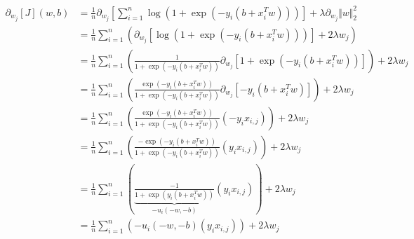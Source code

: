 \documentclass[]{article}
\begin{document}
        \begin{align*}\tag{A.6.a.2}\label{eqn:A.6.a.2}
            \partial_{w_j} \left[
                J
            \right](w, b) 
            &= \frac{1}{n} \partial_{w_j} \left[ 
                \sum_{i = 1}^{n}
                \log(1 + \exp(-y_i(b + x^T_iw))) 
            \right]
            +\lambda\partial_{w_j} \Vert w\Vert_2^2
            \\
            &= 
            \frac{1}{n} \sum_{i = 1}^{n}
            \left(
                \partial_{w_j} \left[ 
                    \log(1 + \exp(-y_i(b + x^T_iw))) 
                \right] + 2\lambda w_j
            \right)
            \\
            &= 
            \frac{1}{n} \sum_{i = 1}^{n}
            \left(
                \frac{1}{1 + \exp(-y_i(b + x^T_iw))}
                \partial_{w_j}
                \left[
                    1 + \exp(-y_i(b + x^T_iw))
                \right]
            \right)
            + 2\lambda w_j
            \\
            &= 
            \frac{1}{n} \sum_{i = 1}^{n}
            \left(
                \frac{
                    \exp(-y_i(b + x_i^Tw))
                }{1 + \exp(-y_i(b + x^T_iw))}
                \partial_{w_j}
                \left[
                    -y_i(b + x_i^Tw)
                \right]
            \right)
            + 2\lambda w_j
            \\
            &= 
            \frac{1}{n} \sum_{i = 1}^{n}
            \left(
                \frac{
                    \exp(-y_i(b + x_i^Tw))
                }{1 + \exp(-y_i(b + x^T_iw))}
                (-y_ix_{i, j})
            \right)
            + 2\lambda w_j
            \\
            &= 
            \frac{1}{n} \sum_{i = 1}^{n}
            \left(
                \frac{
                    -\exp(-y_i(b + x_i^Tw))
                }{1 + \exp(-y_i(b + x^T_iw))}
                (y_ix_{i, j})
            \right)
            + 2\lambda w_j
            \\
            &= 
            \frac{1}{n} \sum_{i = 1}^{n}
            \left(
                \underbrace{\frac{
                    -1
                }{1 + \exp(y_i(b + x^T_iw))}}_{-u_i(-w, -b)}
                (y_ix_{i, j})
            \right)
            + 2\lambda w_j
            \\
            &=
            \frac{1}{n} \sum_{i = 1}^{n}
            \left(
                -u_i(-w, -b)
                (y_ix_{i, j})
            \right)
            + 2\lambda w_j
        \end{align*}
\end{document}
